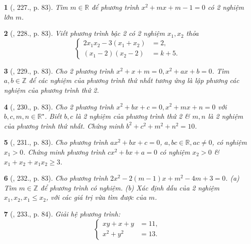 \documentclass{article}
\newtheorem{baitoan}{}
\begin{document}
\begin{baitoan}[\cite{Tuyen_Toan_9_old}, 227., p. 83]
	Tìm $m\in\mathbb{R}$ để phương trình $x^2 + mx + m - 1 = 0$ có 2 nghiệm lớn $m$.
\end{baitoan}

\begin{baitoan}[\cite{Tuyen_Toan_9_old}, 228., p. 83]
	Viết phương trình bậc 2 có 2 nghiệm $x_1,x_2$ thỏa
	\begin{equation*}
		\left\{\begin{split}
			2x_1x_2 - 3(x_1 + x_2) &= 2,\\
			(x_1 - 2)(x_2 - 2) &= k + 5.
		\end{split}\right.
	\end{equation*}
\end{baitoan}

\begin{baitoan}[\cite{Tuyen_Toan_9_old}, 229., p. 83]
	Cho 2 phương trình $x^2 + x + m = 0,x^2 + ax + b = 0$. Tìm $a,b\in\mathbb{Z}$ để các nghiệm của phương trình thứ nhất tương ứng là lập phương các nghiệm của phương trình thứ 2.
\end{baitoan}

\begin{baitoan}[\cite{Tuyen_Toan_9_old}, 230., p. 83]
	Cho 2 phương trình $x^2 + bx + c = 0,x^2 + mx + n = 0$ với $b,c,m,n\in\mathbb{R}^\star$. Biết $b,c$ là 2 nghiệm của phương trình thứ 2 \& $m,n$ là 2 nghiệm của phương trình thứ nhất. Chứng minh $b^2 + c^2 + m^2 + n^2 = 10$.
\end{baitoan}

\begin{baitoan}[\cite{Tuyen_Toan_9_old}, 231., p. 83]
	Cho phương trình $ax^2 + bx + c = 0$, $a,bc\in\mathbb{R},ac\ne0$, có nghiệm $x_1 > 0$. Chứng minh phương trình $cx^2 + bx + a = 0$ có nghiệm $x_2 > 0$ \& $x_1 + x_2 + x_1x_2\ge3$.
\end{baitoan}

\begin{baitoan}[\cite{Tuyen_Toan_9_old}, 232., p. 83]
	Cho phương trình $2x^2 - 2(m - 1)x + m^2 - 4m + 3 = 0$. (a) Tìm $m\in\mathbb{Z}$ để phương trình có nghiệm. (b) Xác định dấu của 2 nghiệm $x_1,x_2,x_1\le x_2$, với các giá trị vừa tìm được của $m$.
\end{baitoan}

\begin{baitoan}[\cite{Tuyen_Toan_9_old}, 233., p. 84]
	Giải hệ phương trình:
	\begin{equation*}
		\left\{\begin{split}
			xy + x + y &= 11,\\
			x^2 + y^2 &= 13.
		\end{split}\right.
	\end{equation*}
\end{baitoan}
\end{document}
